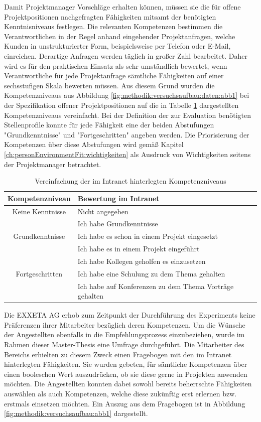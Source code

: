 Damit Projektmanager Vorschläge erhalten können, müssen sie die für offene Projektpositionen nachgefragten Fähigkeiten mitsamt der benötigten Kenntnisniveaus festlegen. Die relevanten Kompetenzen bestimmen die Verantwortlichen in der Regel anhand eingehender Projektanfragen, welche Kunden in unstrukturierter Form, beispielsweise per Telefon oder E-Mail, einreichen. Derartige Anfragen werden täglich in großer Zahl bearbeitet. Daher wird es für den praktischen Einsatz als sehr umständlich bewertet, wenn Verantwortliche für jede Projektanfrage sämtliche Fähigkeiten auf einer sechsstufigen Skala bewerten müssen. Aus diesem Grund wurden die Kompetenzniveaus aus Abbildung \ref{fig:methodik:versuchsaufbau:daten:abb1} bei der Spezifikation offener Projektpositionen auf die in Tabelle \ref{tbl:methodik:versuchsaufbau:systemarchitektur:matrixservice:tbl1} dargestellten Kompetenzniveaus vereinfacht. Bei der Definition der zur Evaluation benötigten Stellenprofile konnte für jede Fähigkeit eine der beiden Abstufungen "Grundkenntnisse" und "Fortgeschritten" angeben werden. Die Priorisierung der Kompetenzen über diese Abstufungen wird gemäß Kapitel \ref{ch:personEnvironmentFit:wichtigkeiten} als Ausdruck von Wichtigkeiten seitens der Projektmanager betrachtet.

\begin{table}[h]
	\centering
	\begin{tabularx}{\textwidth}{c|X}
		\textbf{Kompetenzniveau} & \textbf{Bewertung im Intranet}\\
		\hline
		Keine Kenntnisse & Nicht angegeben\\
		\hline
		& Ich habe Grundkenntnisse\\
		Grundkenntnisse & Ich habe es schon in einem Projekt eingesetzt\\
		& Ich habe es in einem Projekt eingeführt\\
		\hline
		& Ich habe Kollegen geholfen es einzusetzen\\
		Fortgeschritten & Ich habe eine Schulung zu dem Thema gehalten\\
		& Ich habe auf Konferenzen zu dem Thema Vorträge gehalten\\
		\hline
	\end{tabularx}
	\caption{Vereinfachung der im Intranet hinterlegten Kompetenzniveaus}
	\label{tbl:methodik:versuchsaufbau:systemarchitektur:matrixservice:tbl1}
\end{table}

Die EXXETA AG erhob zum Zeitpunkt der Durchführung des Experiments keine Präferenzen ihrer Mitarbeiter bezüglich deren Kompetenzen. Um die Wünsche der Angestellten ebenfalls in die Empfehlungsprozess einzubeziehen, wurde im Rahmen dieser Master-Thesis eine Umfrage durchgeführt. Die Mitarbeiter des Bereichs \JES erhielten zu diesem Zweck einen Fragebogen mit den \anzFaehigkeiten im Intranet hinterlegten Fähigkeiten. Sie wurden gebeten, für sämtliche Kompetenzen über einen booleschen Wert auszudrücken, ob sie diese gerne in Projekten anwenden möchten. Die Angestellten konnten dabei sowohl bereits beherrschte Fähigkeiten auswählen als auch Kompetenzen, welche diese zukünftig erst erlernen bzw. erstmals einsetzen möchten. Ein Auszug aus dem Fragebogen ist in Abbildung \ref{fig:methodik:versuchsaufbau:abb1} dargestellt.

